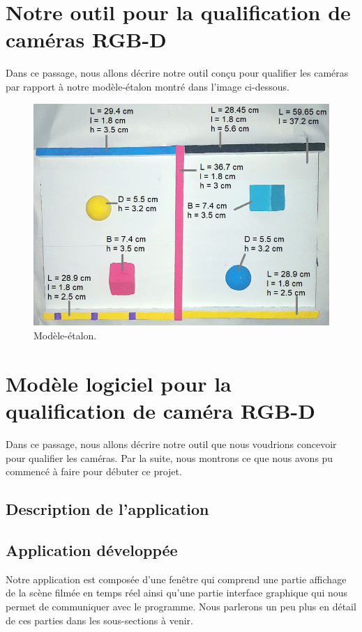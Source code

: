 \documentclass[a4paper, 12pt]{book}
\newcounter{program}[subsection]
\begin{document}
\chapter[Notre outil pour la qualification]{Notre outil pour la qualification de caméras RGB-D}
Dans ce passage, nous allons décrire notre outil conçu pour qualifier les caméras par rapport à notre modèle-étalon montré dans l'image ci-dessous.

\begin{figure}[htbp]
  \hspace{0.75cm}
 \includegraphics[scale=0.5]{images/realModel.png} \hspace{2cm}
  \caption{Modèle-étalon.\label{fig-model}}
\end{figure}

\chapter[Modèle logiciel pour la qualification]{Modèle logiciel pour la qualification de caméra RGB-D}
Dans ce passage, nous allons décrire notre outil que nous voudrions concevoir pour qualifier les caméras. Par la suite, nous montrons ce que nous avons pu commencé à faire pour débuter ce projet.


\section{Description de l'application}


\section{Application développée}
Notre application est composée d'une fenêtre qui comprend une partie affichage de la scène filmée en temps réel ainsi qu'une partie interface graphique qui nous permet de communiquer avec le programme. Nous parlerons un peu plus en détail de ces parties dans les sous-sections à venir.
\end{document}
